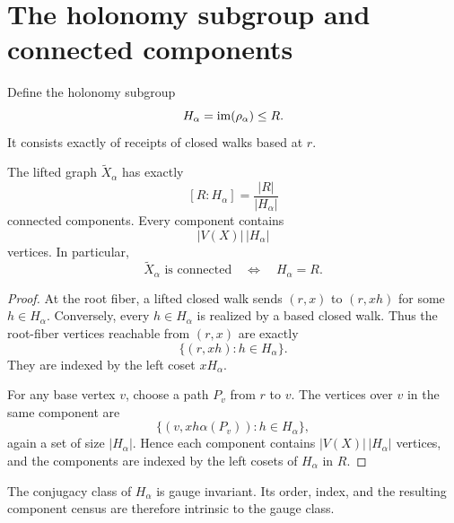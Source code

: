 \section{The holonomy subgroup and connected components}

Define the holonomy subgroup
\[
H_{\alpha}=\operatorname{im}(\rho_{\alpha})\leq R.
\]
It consists exactly of receipts of closed walks based at $r$.

\begin{theorem}
The lifted graph $\widetilde X_{\alpha}$ has exactly
\[
[R:H_{\alpha}]=\frac{|R|}{|H_{\alpha}|}
\]
connected components. Every component contains
\[
|V(X)|\,|H_{\alpha}|
\]
vertices. In particular,
\[
\widetilde X_{\alpha}\text{ is connected}
\quad\Longleftrightarrow\quad
H_{\alpha}=R.
\]
\end{theorem}

\begin{proof}
At the root fiber, a lifted closed walk sends $(r,x)$ to $(r,xh)$ for some
$h\in H_{\alpha}$. Conversely, every $h\in H_{\alpha}$ is realized by a
based closed walk. Thus the root-fiber vertices reachable from $(r,x)$ are
exactly
\[
\{(r,xh):h\in H_{\alpha}\}.
\]
They are indexed by the left coset $xH_{\alpha}$.

For any base vertex $v$, choose a path $P_v$ from $r$ to $v$. The vertices
over $v$ in the same component are
\[
\{(v,xh\alpha(P_v)):h\in H_{\alpha}\},
\]
again a set of size $|H_{\alpha}|$. Hence each component contains
$|V(X)|\,|H_{\alpha}|$ vertices, and the components are indexed by the
left cosets of $H_{\alpha}$ in $R$.
\end{proof}

The conjugacy class of $H_{\alpha}$ is gauge invariant. Its order, index, and
the resulting component census are therefore intrinsic to the gauge class.
